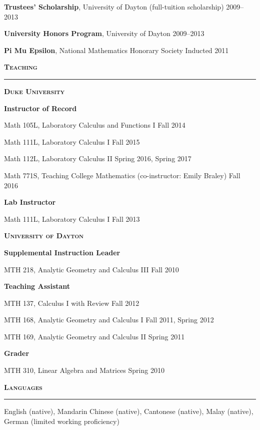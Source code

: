 \documentclass[10pt]{article}
\newcommand{\sect}[1]{
\vspace{.75em}
\textbf{\textsc{\Large #1}}

\vspace{-1.5em}
\noindent\rule{\textwidth}{.5pt}
\vspace{-1.5em}
}
\begin{document}
\textbf{Trustees' Scholarship}, University of Dayton (full-tuition
scholarship) \hfill 2009--2013


\textbf{University Honors Program}, University of Dayton \hfill
2009--2013

\textbf{Pi Mu Epsilon}, National Mathematics Honorary Society \hfill
Inducted 2011\setlength{\parskip}{.75em}

\sect{Teaching}

\textbf{\textsc{\large Duke University}}

\setlength{\leftskip}{1em}

\vspace{-.25em}
\textbf{Instructor of Record}
\setlength{\parskip}{.25em}

Math 105L, Laboratory Calculus and Functions I \hfill Fall 2014

Math 111L, Laboratory Calculus I \hfill Fall 2015

Math 112L, Laboratory Calculus II \hfill Spring 2016, Spring 2017

Math 771S, Teaching College Mathematics (co-instructor: Emily Braley) \hfill
Fall 2016\setlength{\parskip}{.75em}

\textbf{Lab Instructor}
\setlength{\parskip}{.25em}

Math 111L, Laboratory Calculus I \hfill Fall 2013\setlength{\parskip}{.75em}

\setlength{\leftskip}{0em}

\vspace{.5em}
\textbf{\textsc{\large University of Dayton}}

\setlength{\leftskip}{1em}

\vspace{-.25em}
\textbf{Supplemental Instruction Leader}
\setlength{\parskip}{.25em}

MTH 218, Analytic Geometry and Calculus III \hfill Fall 2010\setlength{\parskip}{.75em}

\textbf{Teaching Assistant}
\setlength{\parskip}{.25em}

MTH 137, Calculus I with Review \hfill Fall 2012

MTH 168, Analytic Geometry and Calculus I \hfill Fall 2011, Spring 2012

MTH 169, Analytic Geometry and Calculus II \hfill Spring
2011\setlength{\parskip}{.75em}

\textbf{Grader}
\setlength{\parskip}{.25em}

MTH 310, Linear Algebra and Matrices \hfill Spring 2010\setlength{\parskip}{.75em}

\setlength{\leftskip}{0em}

\sect{Languages}

English (native), Mandarin Chinese (native), Cantonese (native), Malay (native),
German (limited working proficiency)
\end{document}
